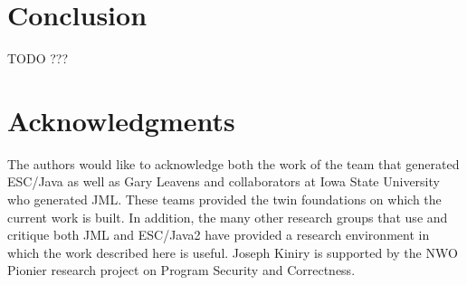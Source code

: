 \documentclass{acm_proc_article-sp}
\begin{document}
\section{Conclusion}
TODO ???

\section{Acknowledgments}
The authors would like to acknowledge both the work of the team that
generated ESC/Java as well as Gary Leavens and collaborators at Iowa
State University who generated JML.  These teams provided the twin
foundations on which the current work is built.  In addition, the many
other research groups that use and critique both JML and ESC/Java2
have provided a research environment in which the work described here
is useful.  Joseph Kiniry is supported by the NWO Pionier research
project on Program Security and Correctness.

%

  
%
%
\balancecolumns

\end{document}
